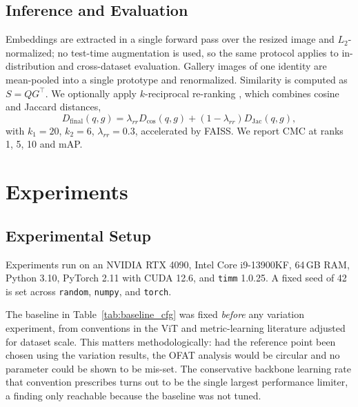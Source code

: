 \documentclass[conference]{IEEEtran}
\begin{document}
\subsection{Inference and Evaluation}

Embeddings are extracted in a single forward pass over the resized image and
$L_2$-normalized; no test-time augmentation is used, so the same protocol applies to
in-distribution and cross-dataset evaluation. Gallery images of one identity are
mean-pooled into a single prototype and renormalized. Similarity is computed as
$S = QG^\top$. We optionally apply $k$-reciprocal re-ranking \cite{zhong2017}, which
combines cosine and Jaccard distances,
\begin{equation}
  D_{\text{final}}(q,g) = \lambda_{rr} D_{\cos}(q,g) + (1-\lambda_{rr}) D_{\text{Jac}}(q,g),
\end{equation}
with $k_1 = 20$, $k_2 = 6$, $\lambda_{rr} = 0.3$, accelerated by FAISS. We report CMC at
ranks 1, 5, 10 and mAP.

\section{Experiments}

\subsection{Experimental Setup}


Experiments run on an NVIDIA RTX 4090, Intel Core i9-13900KF, 64\,GB RAM, Python 3.10,
PyTorch 2.11 with CUDA 12.6, and \texttt{timm} 1.0.25. A fixed seed of 42 is set across
\texttt{random}, \texttt{numpy}, and \texttt{torch}.

The baseline in Table~\ref{tab:baseline_cfg} was fixed \emph{before} any variation
experiment, from conventions in the ViT and metric-learning literature adjusted for
dataset scale. This matters methodologically: had the reference point been chosen using
the variation results, the OFAT analysis would be circular and no parameter could be
shown to be mis-set. The conservative backbone learning rate that convention prescribes
turns out to be the single largest performance limiter, a finding only reachable
because the baseline was not tuned.
\end{document}
